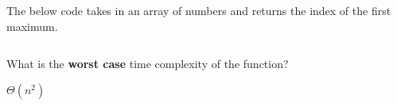 \begin{prob}
    The below code takes in an array of numbers and returns the index of the first maximum.

    \inputminted{python}{./code.py}

    What is the \textbf{worst case} time complexity of the function?

    \begin{soln}
        $\Theta(n^2)$
    \end{soln}

\end{prob}
